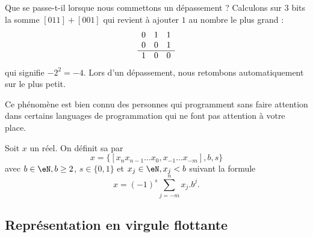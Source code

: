 \begin{normaltext}[Le dépassement]
	Que se passe-t-il lorsque nous commettons un dépassement ? Calculons sur \( 3\) bits la somme \( [011]+[001]\) qui revient à ajouter \( 1\) au nombre le plus grand :
	\begin{equation*}
		\begin{array}[]{ccc}
			0 & 1 & 1 \\
			0 & 0 & 1 \\
			\hline
			1 & 0 & 0 \\
		\end{array}
	\end{equation*}
	qui signifie \( -2^2=-4\). Lors d'un dépassement, nous retombons automatiquement sur le plus petit.

	Ce phénomène est bien connu des personnes qui programment sans faire attention dans certains languages de programmation qui ne font pas attention à votre place.
\end{normaltext}


\begin{definition}
	Soit \( x\) un réel. On définit sa  par
	\begin{equation}
		x=\{[x_nx_{n-1}...x_0,x_{-1}...x_{-m}], b, s\}
	\end{equation}
	avec  \( b\in\eN, b\geq2\), \( s\in\{0,1\}\) et \( x_j\in\eN,x_j<b\) suivant la formule
	\begin{equation}
		x=(-1)^{s}\sum_{j=-m}^nx_j.b^j.
	\end{equation}
\end{definition}

\subsection{Représentation en virgule flottante}

